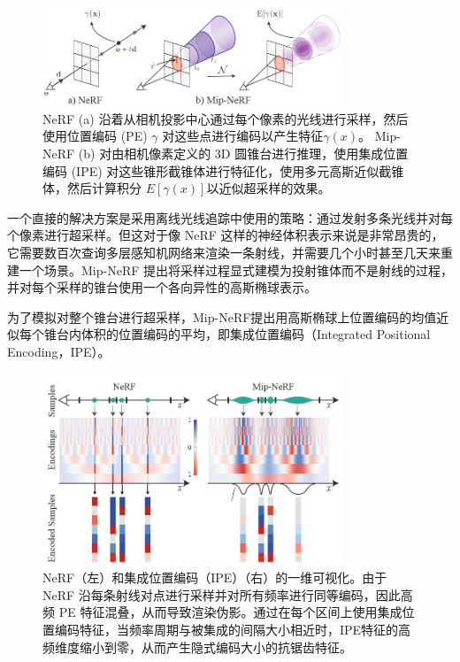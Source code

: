 \begin{figure}[ht]
    \centering
    \includegraphics[width=0.8\textwidth]{undergraduate-thesis/images/related-work/mipnerf-cone.png}
    \caption{NeRF (a) 沿着从相机投影中心通过每个像素的光线进行采样，然后使用位置编码 (PE) $\gamma$ 对这些点进行编码以产生特征$\gamma(x)$。 Mip-NeRF (b) 对由相机像素定义的 3D 圆锥台进行推理，使用集成位置编码 (IPE) 对这些锥形截锥体进行特征化，使用多元高斯近似截锥体，然后计算积分 $E[\gamma(x)]$以近似超采样的效果\cite{barron_mip-nerf_2021}。}
    \label{fig:related-work mip-nerf cone tracing}
\end{figure}

一个直接的解决方案是采用离线光线追踪中使用的策略：通过发射多条光线并对每个像素进行超采样。但这对于像 NeRF 这样的神经体积表示来说是非常昂贵的，它需要数百次查询多层感知机网络来渲染一条射线，并需要几个小时甚至几天来重建一个场景。Mip-NeRF \cite{barron_mip-nerf_2021}提出将采样过程显式建模为投射锥体而不是射线的过程，并对每个采样的锥台使用一个各向异性的高斯椭球表示。

为了模拟对整个锥台进行超采样，Mip-NeRF提出用高斯椭球上位置编码的均值近似每个锥台内体积的位置编码的平均，即集成位置编码（Integrated Positional Encoding，IPE）。
\begin{figure}[ht]
    \centering
    \includegraphics[width=0.8\textwidth]{undergraduate-thesis/images/related-work/mipnerf-encoding.png}
    \caption{NeRF（左）和集成位置编码（IPE）（右）的一维可视化。由于 NeRF 沿每条射线对点进行采样并对所有频率进行同等编码，因此高频 PE 特征混叠，从而导致渲染伪影。通过在每个区间上使用集成位置编码特征，当频率周期与被集成的间隔大小相近时，IPE特征的高频维度缩小到零，从而产生隐式编码大小的抗锯齿特征。\cite{barron_mip-nerf_2021}}
    \label{fig:related-work mip-nerf encoding}
\end{figure}

